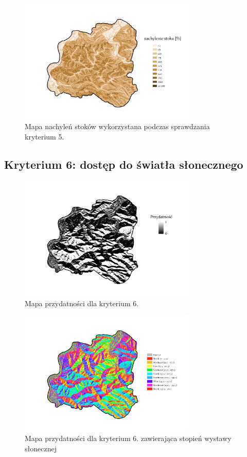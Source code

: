 \documentclass{article}
\begin{document}
\begin{figure}[H]
    \centering
    \includegraphics[width=0.75\textwidth]{img/plesna-kryterium5-stoki.jpg}
    \caption*{Mapa nachyleń stoków wykorzystana podczas sprawdzania kryterium 5.}
\end{figure}


\subsection{Kryterium 6: dostęp do światła słonecznego}
\begin{figure}[H]
    \centering
    \includegraphics[width=0.75\textwidth]{img/plesna-kryterium6-layout.jpg}
    \caption*{Mapa przydatności dla kryterium 6.}
\end{figure}

\begin{figure}[H]
    \centering
    \includegraphics[width=0.75\textwidth]{img/plesna-kryterium6-aspect.jpg}
    \caption*{Mapa przydatności dla kryterium 6. zawierająca stopień wystawy słonecznej}
\end{figure}
\end{document}
